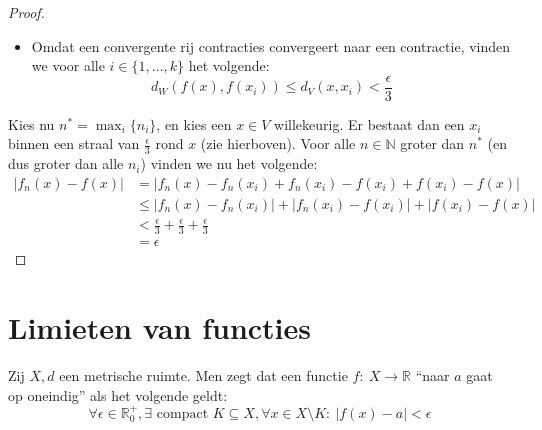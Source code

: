 \documentclass[main.tex]{subfiles}
\begin{document}
\begin{st}
\begin{proof}
\begin{itemize}
    \item Omdat een convergente rij contracties convergeert naar een contractie, vinden we voor alle $i\in\{1,\dotsc,k\}$ het volgende:
      \[ d_{W}(f(x),f(x_{i})) \le d_{V}(x,x_{i}) < \frac{\epsilon}{3} \]
    \end{itemize}
    Kies nu $n^{*} = \max_{i}\{ n_{i}\}$, en kies een $x\in V$ willekeurig.
    Er bestaat dan een $x_{i}$ binnen een straal van $\frac{\epsilon}{3}$ rond $x$ (zie hierboven).
    Voor alle $n\in \mathbb{N}$ groter dan $n^{*}$ (en dus groter dan alle $n_{i}$) vinden we nu het volgende:
    \begin{align*}
      |f_{n}(x) - f(x)|
      &= |f_{n}(x) - f_{n}(x_{i}) + f_{n}(x_{i}) - f(x_{i}) + f(x_{i}) - f(x)|\\
      &\le |f_{n}(x) - f_{n}(x_{i})| + |f_{n}(x_{i}) - f(x_{i})| + |f(x_{i}) - f(x)|\\
      &< \frac{\epsilon}{3} + \frac{\epsilon}{3} +\frac{\epsilon}{3}\\
      &= \epsilon
    \end{align*}
  \end{proof}
\end{st}

\section{Limieten van functies}
\label{sec:limi-van-funct}

\begin{de}
  Zij $X,d$ een metrische ruimte.
  Men zegt dat een functie $f:\ X \rightarrow \mathbb{R}$ ``naar $a$ gaat op oneindig'' als het volgende geldt:
  \[ \forall \epsilon \in \mathbb{R}_{0}^{+}, \exists \text{ compact } K \subseteq X, \forall x\in X \setminus K:\ |f(x)-a|< \epsilon \]
\end{de}
\end{document}
